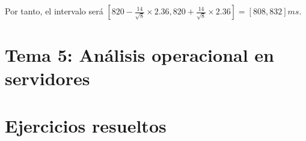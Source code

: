 \documentclass[12pt,spanish]{article}
\begin{document}
Por tanto, el intervalo será $	[820-\frac{14}{\sqrt{8}} \times 2.36, 820+\frac{14}{\sqrt{8}} \times 2.36] = [808,832]ms$.

\section{Tema 5: Análisis operacional en servidores}



















\section{Ejercicios resueltos}
\end{document}
